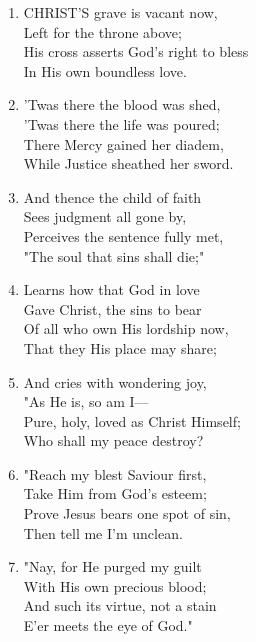\documentclass[11pt,a4paper]{article}
\begin{document}
\begin{enumerate}
    \item CHRIST'S grave is vacant now, \\
            Left for the throne above; \\
        His cross asserts God's right to bless \\
            In His own boundless love.

    \item 'Twas there the blood was shed, \\
            'Twas there the life was poured; \\
        There Mercy gained her diadem, \\
            While Justice sheathed her sword.

    \item And thence the child of faith \\
            Sees judgment all gone by, \\
        Perceives the sentence fully met, \\
            "The soul that sins shall die;"

    \item Learns how that God in love \\
            Gave Christ, the sins to bear \\
        Of all who own His lordship now, \\
            That they His place may share;

    \item And cries with wondering joy, \\
            "As He is, so am I--- \\
        Pure, holy, loved as Christ Himself; \\
            Who shall my peace destroy?

    \item "Reach my blest Saviour first, \\
            Take Him from God's esteem; \\
        Prove Jesus bears one spot of sin, \\
            Then tell me I'm unclean.

    \item "Nay, for He purged my guilt \\
            With His own precious blood; \\
        And such its virtue, not a stain \\
            E'er meets the eye of God."

\end{enumerate}
\end{document}

